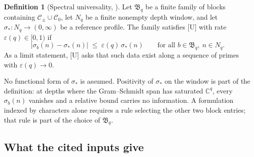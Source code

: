 \documentclass[12pt,a4paper]{article}
\theoremstyle{definition}
\newtheorem{definition}[theorem]{Definition}
\theoremstyle{remark}
\newcommand{\Bq}{\mathfrak{B}_q}
\newcommand{\Nq}{N_q}
\newcommand{\Cpm}{\mathcal{C}_{\pm}}
\newcommand{\Czero}{\mathcal{C}_{0}}
\begin{document}
      \begin{definition}[Spectral universality, {\upshape [U]}]\label{def:universality}
        Let $\Bq$ be a finite family of blocks containing $\Cpm \cup \Czero$, let $\Nq$ be a finite nonempty depth
        window, and let $\sigma_* \colon \Nq \to (0, \infty)$ be a reference profile.
        The family satisfies \textup{[U]} with rate $\varepsilon(q) \in [0, 1)$ if
        \begin{equation}\label{eq:universality}
          \bigl|\sigma_b(n) - \sigma_*(n)\bigr| \;\leq\; \varepsilon(q)\,\sigma_*(n)
          \qquad \text{for all } b \in \Bq,\ n \in \Nq.
        \end{equation}
        As a limit statement, \textup{[U]} asks that such data exist along a sequence of primes with
        $\varepsilon(q) \to 0$.
      \end{definition}

      No functional form of $\sigma_*$ is assumed.
      Positivity of $\sigma_*$ on the window is part of the definition: at depths where the Gram--Schmidt span has
      saturated $\mathbb{C}^q$, every $\sigma_b(n)$ vanishes and a relative bound carries no information.
      A formulation indexed by characters alone requires a rule selecting the other two block entries; that rule is
      part of the choice of $\Bq$.

    \subsection{What the cited inputs give}
\end{document}
